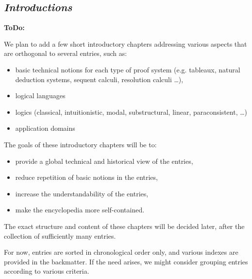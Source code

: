 
\begin{partbacktext}
\part{\emph{Introductions}}

\noindent \begin{large}\textbf{ToDo:} \end{large}

\noindent We plan to add a few short introductory chapters addressing various aspects that are orthogonal to several entries, such as: 
\begin{itemize}
\item basic technical notions for each type of proof system (e.g. tableaux, natural deduction systems, sequent calculi, resolution calculi \ldots),
\item logical languages
\item logics (classical, intuitionistic, modal, substructural, linear, paraconsistent, \ldots)
\item application domains
\end{itemize}

\noindent
The goals of these introductory chapters will be to:
\begin{itemize} 
\item provide a global technical and historical view of the entries,
\item reduce repetition of basic notions in the entries,
\item increase the understandability of the entries,
\item make the encyclopedia more self-contained.
\end{itemize}

\noindent
The exact structure and content of these chapters will be decided later, after the collection of sufficiently many entries.

For now, entries are sorted in chronological order only, and various indexes are provided in the backmatter. If the need arises, we might consider grouping entries according to various criteria.


\end{partbacktext}